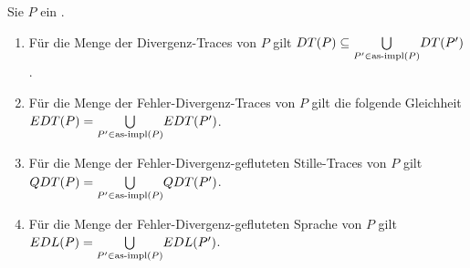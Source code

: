 \vspace{0.2cm}

\begin{Prop}
  \label{DivSemProp}
  Sie $P$ ein \MEIO{}.
  \begin{enumerate}
    \item Für die Menge der Divergenz-Traces von $P$ gilt $DT (P) \subseteq
      \underset{P'\in\mathrm{as}\text{-}\mathrm{impl} (P)}{\bigcup} DT (P')$.
    \item Für die Menge der Fehler-Divergenz-Traces von $P$ gilt die folgende
      Gleichheit $EDT (P) = \underset{P'\in\mathrm{as}\text{-}\mathrm{impl} (P)}{\bigcup} EDT (P')$.
    \item Für die Menge der Fehler-Divergenz-gefluteten Stille-Traces von $P$
      gilt $QDT (P) = \underset{P'\in\mathrm{as}\text{-}\mathrm{impl} (P)}{\bigcup} QDT (P')$.
    \item Für die Menge der Fehler-Divergenz-gefluteten Sprache von $P$ gilt
      $EDL (P) = \underset{P'\in\mathrm{as}\text{-}\mathrm{impl} (P)}{\bigcup} EDL (P')$.
  \end{enumerate}
\end{Prop}
